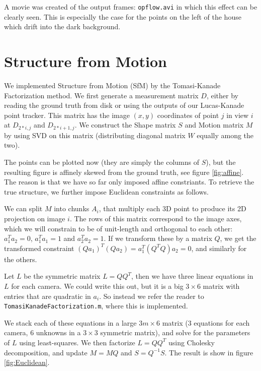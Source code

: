 \documentclass[a4paper,10pt]{article}
\begin{document}
A movie was created of the output frames: \verb|opflow.avi| in which this effect can be clearly seen. This is especially the case for the points on the left of the house which drift into the dark background.

\clearpage

\section{Structure from Motion}

We implemented Structure from Motion (SfM) by the Tomasi-Kanade Factorization method.
We first generate a measurement matrix $D$, either by reading the ground truth from disk or using the outputs of our Lucas-Kanade point tracker.
This matrix has the image $(x,y)$ coordinates of point $j$ in view $i$ at $D_{2*i, j}$ and $D_{2*i+1,j}$.
We construct the Shape matrix $S$ and Motion matrix $M$ by using SVD on this matrix (distributing diagonal matrix $W$ equally among the two).

The points can be plotted now (they are simply the columns of $S$), but the resulting figure is affinely skewed from the ground truth, see figure \ref{fig:affine}.
The reason is that we have so far only imposed affine constriants.
To retrieve the true structure, we further impose Euclidean constraints as follows.

We can split $M$ into chunks $A_i$, that multiply each 3D point to produce its 2D projection on image $i$.
The rows of this matrix correspond to the image axes, which we will constrain to be of unit-length and orthogonal to each other:
$a_1^T a_2 = 0$, $a_1^T a_1 = 1$ and $a_2^T a_2 = 1$.
If we transform these by a matrix $Q$, we get the transformed constraint $(Q a_1)^T (Q a_2) = a_1^T (Q^T Q) a_2 = 0$, and similarly for the others.

Let $L$ be the symmetric matrix $L = Q Q^T$, then we have three linear equations in $L$ for each camera.
We could write this out, but it is a big $3 \times 6$ matrix with entries that are quadratic in $a_i$.
So instead we refer the reader to \verb+TomasiKanadeFactorization.m+, where this is implemented.

We stack each of these equations in a large $3m \times 6$ matrix (3 equations for each camera, 6 unknowns in a $3\times 3$ symmetric matrix), and solve for the parameters of $L$ using least-squares.
We then factorize $L = Q Q^T$ using Cholesky decomposition, and update $M = M Q$ and $S = Q^{-1} S$.
The result is show in figure \ref{fig:Euclidean}.
\end{document}
